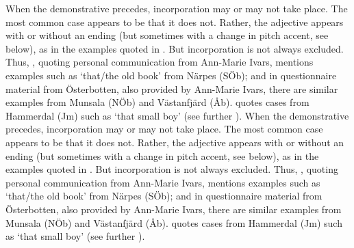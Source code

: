 When the demonstrative precedes, incorporation may or may not take place. The most common case appears to be that it does not. Rather, the adjective appears with or without an ending (but sometimes with a change in pitch accent, see below), as in the examples quoted in . But incorporation is not always excluded. Thus, \citet[159]{Vangsnes2003}, quoting personal communication from Ann-Marie Ivars, mentions examples such as ‘that/the old book’ from Närpes (SÖb); and in questionnaire material from Österbotten, also provided by Ann-Marie Ivars, there are similar examples from Munsala (NÖb) and Västanfjärd (Åb). \citet[38]{Reinhammar2005} quotes cases from Hammerdal (Jm) such as ‘that small boy’ (see further ).
When the demonstrative precedes, incorporation may or may not take place. The most common case appears to be that it does not. Rather, the adjective appears with or without an ending (but sometimes with a change in pitch accent, see below), as in the examples quoted in . But incorporation is not always excluded. Thus, \citet[159]{Vangsnes2003}, quoting personal communication from Ann-Marie Ivars, mentions examples such as ‘that/the old book’ from Närpes (SÖb); and in questionnaire material from Österbotten, also provided by Ann-Marie Ivars, there are similar examples from Munsala (NÖb) and Västanfjärd (Åb). \citet[38]{Reinhammar2005} quotes cases from Hammerdal (Jm) such as ‘that small boy’ (see further ).

